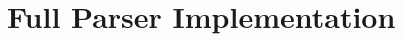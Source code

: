 \section{Full Parser Implementation}
\label{sec:parserimplementation}
\inputminted[linenos,frame=lines]{hs}{./Parser.hs}
